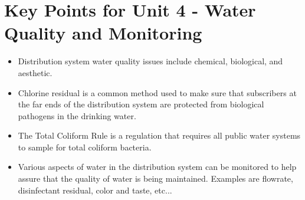\documentclass[10pt]{article}
\begin{document}
\section{Key Points for Unit 4 - Water Quality and Monitoring}
\begin{itemize}
  \item Distribution system water quality issues include chemical, biological, and aesthetic.

  \item Chlorine residual is a common method used to make sure that subscribers at the far ends of the distribution system are protected from biological pathogens in the drinking water.

  \item The Total Coliform Rule is a regulation that requires all public water systems to sample for total coliform bacteria.

  \item Various aspects of water in the distribution system can be monitored to help assure that the quality of water is being maintained. Examples are flowrate, disinfectant residual, color and taste, etc...

\end{itemize}
\end{document}
